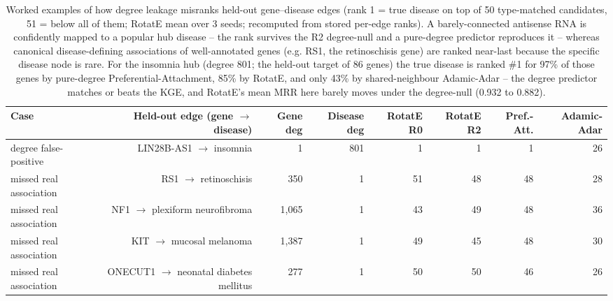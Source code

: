 \begin{table}[H]
\centering
\caption{Worked examples of how degree leakage misranks held-out gene--disease edges (rank 1 = true disease on top of 50 type-matched candidates, 51 = below all of them; RotatE mean over 3 seeds; recomputed from stored per-edge ranks). A barely-connected antisense RNA is confidently mapped to a popular hub disease -- the rank survives the R2 degree-null and a pure-degree predictor reproduces it -- whereas canonical disease-defining associations of well-annotated genes (e.g. RS1, the retinoschisis gene) are ranked near-last because the specific disease node is rare. For the insomnia hub (degree 801; the held-out target of 86 genes) the true disease is ranked \#1 for 97\% of those genes by pure-degree Preferential-Attachment, 85\% by RotatE, and only 43\% by shared-neighbour Adamic-Adar -- the degree predictor matches or beats the KGE, and RotatE's mean MRR here barely moves under the degree-null (0.932 to 0.882).}
\label{tab:case_study}
\begin{tabular}{lrrrrrrr}
\toprule
Case & Held-out edge (gene $\to$ disease) & Gene deg & Disease deg & RotatE R0 & RotatE R2 & Pref.-Att. & Adamic-Adar \\
\midrule
degree false-positive & LIN28B-AS1 $\to$ insomnia & 1 & 801 & 1 & 1 & 1 & 26 \\
missed real association & RS1 $\to$ retinoschisis & 350 & 1 & 51 & 48 & 48 & 28 \\
missed real association & NF1 $\to$ plexiform neurofibroma & 1,065 & 1 & 43 & 49 & 48 & 36 \\
missed real association & KIT $\to$ mucosal melanoma & 1,387 & 1 & 49 & 45 & 48 & 30 \\
missed real association & ONECUT1 $\to$ neonatal diabetes mellitus & 277 & 1 & 50 & 50 & 46 & 26 \\
\bottomrule
\end{tabular}
\end{table}
